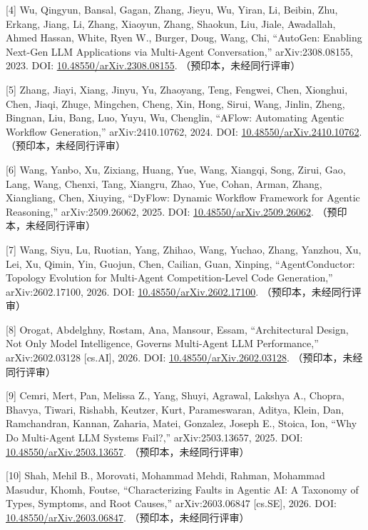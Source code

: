 \documentclass[
]{article}
\begin{document}
{[}4{]} Wu, Qingyun, Bansal, Gagan, Zhang, Jieyu, Wu, Yiran, Li, Beibin,
Zhu, Erkang, Jiang, Li, Zhang, Xiaoyun, Zhang, Shaokun, Liu, Jiale,
Awadallah, Ahmed Hassan, White, Ryen W., Burger, Doug, Wang, Chi,
``AutoGen: Enabling Next-Gen LLM Applications via Multi-Agent
Conversation,'' arXiv:2308.08155, 2023. DOI:
\href{https://doi.org/10.48550/arXiv.2308.08155}{10.48550/arXiv.2308.08155}.
（预印本，未经同行评审）

{[}5{]} Zhang, Jiayi, Xiang, Jinyu, Yu, Zhaoyang, Teng, Fengwei, Chen,
Xionghui, Chen, Jiaqi, Zhuge, Mingchen, Cheng, Xin, Hong, Sirui, Wang,
Jinlin, Zheng, Bingnan, Liu, Bang, Luo, Yuyu, Wu, Chenglin, ``AFlow:
Automating Agentic Workflow Generation,'' arXiv:2410.10762, 2024. DOI:
\href{https://doi.org/10.48550/arXiv.2410.10762}{10.48550/arXiv.2410.10762}.
（预印本，未经同行评审）

{[}6{]} Wang, Yanbo, Xu, Zixiang, Huang, Yue, Wang, Xiangqi, Song,
Zirui, Gao, Lang, Wang, Chenxi, Tang, Xiangru, Zhao, Yue, Cohan, Arman,
Zhang, Xiangliang, Chen, Xiuying, ``DyFlow: Dynamic Workflow Framework
for Agentic Reasoning,'' arXiv:2509.26062, 2025. DOI:
\href{https://doi.org/10.48550/arXiv.2509.26062}{10.48550/arXiv.2509.26062}.
（预印本，未经同行评审）

{[}7{]} Wang, Siyu, Lu, Ruotian, Yang, Zhihao, Wang, Yuchao, Zhang,
Yanzhou, Xu, Lei, Xu, Qimin, Yin, Guojun, Chen, Cailian, Guan, Xinping,
``AgentConductor: Topology Evolution for Multi-Agent Competition-Level
Code Generation,'' arXiv:2602.17100, 2026. DOI:
\href{https://doi.org/10.48550/arXiv.2602.17100}{10.48550/arXiv.2602.17100}.
（预印本，未经同行评审）

{[}8{]} Orogat, Abdelghny, Rostam, Ana, Mansour, Essam, ``Architectural
Design, Not Only Model Intelligence, Governs Multi-Agent LLM
Performance,'' arXiv:2602.03128 {[}cs.AI{]}, 2026. DOI:
\href{https://doi.org/10.48550/arXiv.2602.03128}{10.48550/arXiv.2602.03128}.
（预印本，未经同行评审）

{[}9{]} Cemri, Mert, Pan, Melissa Z., Yang, Shuyi, Agrawal, Lakshya A.,
Chopra, Bhavya, Tiwari, Rishabh, Keutzer, Kurt, Parameswaran, Aditya,
Klein, Dan, Ramchandran, Kannan, Zaharia, Matei, Gonzalez, Joseph E.,
Stoica, Ion, ``Why Do Multi-Agent LLM Systems Fail?,'' arXiv:2503.13657,
2025. DOI:
\href{https://doi.org/10.48550/arXiv.2503.13657}{10.48550/arXiv.2503.13657}.
（预印本，未经同行评审）

{[}10{]} Shah, Mehil B., Morovati, Mohammad Mehdi, Rahman, Mohammad
Masudur, Khomh, Foutse, ``Characterizing Faults in Agentic AI: A
Taxonomy of Types, Symptoms, and Root Causes,'' arXiv:2603.06847
{[}cs.SE{]}, 2026. DOI:
\href{https://doi.org/10.48550/arXiv.2603.06847}{10.48550/arXiv.2603.06847}.
（预印本，未经同行评审）
\end{document}
